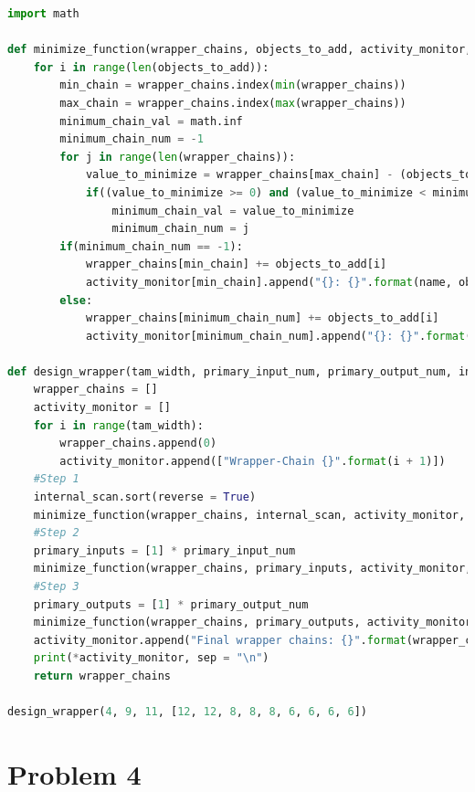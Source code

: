 \documentclass[letterpaper]{article} %
\begin{document}
\begin{lstlisting}[language=Python, caption=Python code used to generate wrapper design.]
import math

def minimize_function(wrapper_chains, objects_to_add, activity_monitor, name):
    for i in range(len(objects_to_add)):
        min_chain = wrapper_chains.index(min(wrapper_chains))
        max_chain = wrapper_chains.index(max(wrapper_chains))
        minimum_chain_val = math.inf
        minimum_chain_num = -1
        for j in range(len(wrapper_chains)):
            value_to_minimize = wrapper_chains[max_chain] - (objects_to_add[i] + wrapper_chains[j])
            if((value_to_minimize >= 0) and (value_to_minimize < minimum_chain_val)):
                minimum_chain_val = value_to_minimize
                minimum_chain_num = j
        if(minimum_chain_num == -1):
            wrapper_chains[min_chain] += objects_to_add[i]
            activity_monitor[min_chain].append("{}: {}".format(name, objects_to_add[i]))
        else:
            wrapper_chains[minimum_chain_num] += objects_to_add[i]
            activity_monitor[minimum_chain_num].append("{}: {}".format(name, objects_to_add[i]))

def design_wrapper(tam_width, primary_input_num, primary_output_num, internal_scan):
    wrapper_chains = []
    activity_monitor = []
    for i in range(tam_width):
        wrapper_chains.append(0)
        activity_monitor.append(["Wrapper-Chain {}".format(i + 1)])
    #Step 1
    internal_scan.sort(reverse = True)
    minimize_function(wrapper_chains, internal_scan, activity_monitor, "sc")
    #Step 2
    primary_inputs = [1] * primary_input_num
    minimize_function(wrapper_chains, primary_inputs, activity_monitor, "pi")
    #Step 3
    primary_outputs = [1] * primary_output_num
    minimize_function(wrapper_chains, primary_outputs, activity_monitor, "po")
    activity_monitor.append("Final wrapper chains: {}".format(wrapper_chains))
    print(*activity_monitor, sep = "\n")
    return wrapper_chains

design_wrapper(4, 9, 11, [12, 12, 8, 8, 8, 6, 6, 6, 6])
\end{lstlisting}

\newpage

\section*{Problem 4 \small{}}
\end{document}

